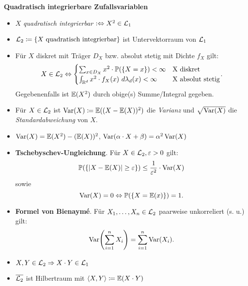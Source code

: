 \textbf{Quadratisch integrierbare Zufallsvariablen}
\begin{itemize}
\item $X$ \textit{quadratisch integrierbar} $:\Leftrightarrow X^2\in\mathcal{L}_1$

\item $\mathcal{L}_2 \coloneqq \{X \text{ quadratisch integrierbar}\}$ ist Untervektorraum von $\mathcal{L}_1$

\item Für $X$ diskret mit Träger $D_X$ bzw. absolut stetig mit Dichte $f_X$ gilt:
  \[
    X\in\L_2\Leftrightarrow
    \begin{cases}
    \sum_{x \in D_X} x^2 \cdot \Pr(\{X=x\}) < \infty			& \text{X diskret} \\
    \int_{\R^d} x^2\cdot f_X(x)~d\lambda_d(x) < \infty		& \text{X absolut stetig}
    \end{cases}.
  \]
Gegebenenfalls ist $\mathbb{E}(X^2)$ durch obige(s) Summe/Integral gegeben.

\item Für $X\in\mathcal{L}_2$ ist $\operatorname{Var}(X) \coloneqq \mathbb{E}((X-\mathbb{E}(X))^2)$ die \textit{Varianz} und $\sqrt{\operatorname{Var}(X)}$ die \textit{Standardabweichung} von $X$.

\item $\operatorname{Var}(X) = \mathbb{E}(X^2) - (\mathbb{E}(X))^2$,
  \quad $\operatorname{Var}(\alpha \cdot X + \beta) = \alpha^2\operatorname{Var}(X)$

\item \textbf{Tschebyschev-Ungleichung}. Für $X\in\mathcal{L}_2, \varepsilon > 0$ gilt:
  \[
    \mathbb{P}(\{|X-\mathbb{E}(X)| \geq \varepsilon\}) \leq \frac{1}{\varepsilon^2} \cdot \operatorname{Var}(X)
  \]
  sowie
  \[
    \operatorname{Var}(X) = 0 \Leftrightarrow \mathbb{P}(\{X=\mathbb{E}(x)\}) = 1.
  \]

\item \textbf{Formel von Bienaymé}. Für $X_1,\ldots,X_n\in\mathcal{L}_2$ paarweise unkorreliert (s. u.) gilt:
  \[
    \Var\left(\sum_{i=1}^n X_i\right) = \sum_{i=1}^n \Var(X_i).
  \]

\item $X,Y\in\mathcal{L}_2 \Rightarrow X \cdot Y \in\mathcal{L}_1$

\item $\overline{\mathcal{L}_2}$ ist Hilbertraum mit $\langle X,Y \rangle \coloneqq \mathbb{E}(X \cdot Y)$
\end{itemize}
\hspace{3em}

